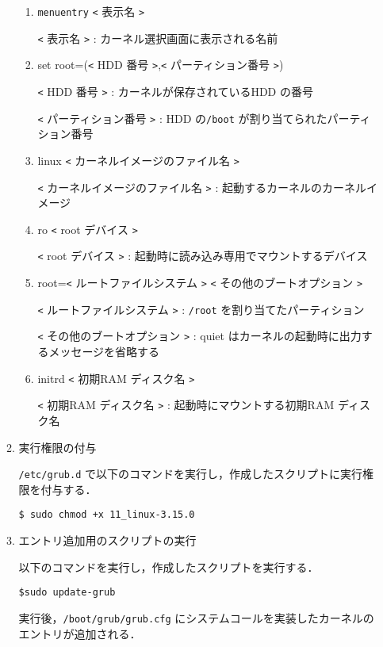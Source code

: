 \documentclass[12pt]{jsarticle}
\begin{document}
\begin{enumerate}
\begin{enumerate}
\begin{enumerate}
\item \verb|menuentry| \verb|<| 表示名 \verb|>|

\verb|<| 表示名 \verb|>| : カーネル選択画面に表示される名前

\item set root=(\verb|<| HDD 番号 \verb|>|,\verb|<| パーティション番号 \verb|>|)

\verb|<| HDD 番号 \verb|>| : カーネルが保存されているHDD の番号

\verb|<| パーティション番号 \verb|>| : HDD の\verb|/boot| が割り当てられたパーティション番号

\item linux \verb|<| カーネルイメージのファイル名 \verb|>|

\verb|<| カーネルイメージのファイル名 \verb|>| : 起動するカーネルのカーネルイメージ

\item ro \verb|<| root デバイス \verb|>|

    \verb|<| root デバイス \verb|>| : 起動時に読み込み専用でマウントするデバイス

\item root=\verb|<| ルートファイルシステム \verb|>| \verb|<| その他のブートオプション \verb|>|

\verb|<| ルートファイルシステム \verb|>| : \verb|/root| を割り当てたパーティション

\verb|<| その他のブートオプション \verb|>| : quiet はカーネルの起動時に出力するメッセージを省略する

\item initrd \verb|<| 初期RAM ディスク名 \verb|>|

\verb|<| 初期RAM ディスク名 \verb|>| : 起動時にマウントする初期RAM ディスク名

\end{enumerate}

\item 実行権限の付与

\verb|/etc/grub.d| で以下のコマンドを実行し，作成したスクリプトに実行権限を付与する．
\begin{verbatim}
$ sudo chmod +x 11_linux-3.15.0
\end{verbatim}

\item エントリ追加用のスクリプトの実行

以下のコマンドを実行し，作成したスクリプトを実行する．
\begin{verbatim}
$sudo update-grub
\end{verbatim}
実行後，\verb|/boot/grub/grub.cfg| にシステムコールを実装したカーネルのエントリが追加される．


\end{enumerate}
\end{enumerate}
\end{document}
